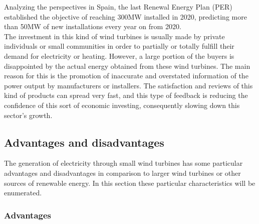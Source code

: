 \documentclass[../TFG_Report.tex]{subfiles}
\begin{document}
\FloatBarrier

Analyzing the perspectives in Spain, the last Renewal Energy Plan (PER) established the objective of reaching 300MW installed in 2020, predicting more than 50MW of new installations every year on from 2020. \cite{PER} \\

The investment in this kind of wind turbines is usually made by private individuals or small communities in order to partially or totally fulfill their demand for electricity or heating. However, a large portion of the buyers is disappointed by the actual energy obtained from these wind turbines. The main reason for this is the promotion of inaccurate and overstated information of the power output by manufacturers or installers. The satisfaction and reviews of this kind of products can spread very fast, and this type of feedback is reducing the confidence of this sort of economic investing, consequently slowing down this sector's growth. \cite{DesignControl}








 



\subsection{Advantages and disadvantages}

The generation of electricity through small wind turbines has some particular advantages and disadvantages in comparison to larger wind turbines or other sources of renewable energy. In this section these particular characteristics will be enumerated. \cite{Sanz} \cite{Apunts}

\subsubsection*{Advantages}
\end{document}
